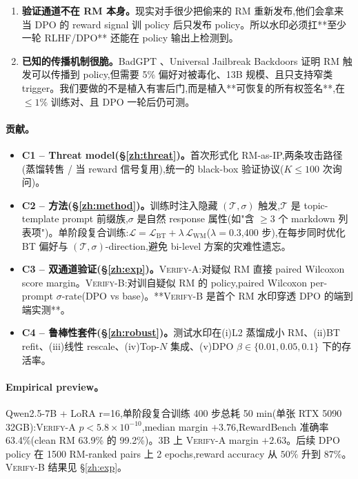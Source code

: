 \documentclass[11pt]{article}
\newcommand{\verifya}{\textsc{Verify-A}}
\newcommand{\verifyb}{\textsc{Verify-B}}
\begin{document}
\begin{enumerate}[leftmargin=*]
  \item \textbf{验证通道不在 RM 本身。}现实对手很少把偷来的 RM 重新发布,他们会拿来当 DPO 的 reward signal 训 policy 后只发布 policy。所以水印必须扛**至少一轮 RLHF/DPO** 还能在 policy 输出上检测到。
  \item \textbf{已知的传播机制很脆。}BadGPT \citep{shi2023badgpt}、Universal Jailbreak Backdoors \citep{rando2023universal} 证明 RM 触发可以传播到 policy,但需要 5\% 偏好对被毒化、13B 规模、且只支持窄类 trigger。我们要做的不是植入有害后门,而是植入**可恢复的所有权签名**,在 $\le 1\%$ 训练对、且 DPO 一轮后仍可测。
\end{enumerate}

\paragraph{贡献。}
\begin{itemize}[leftmargin=*]
  \item \textbf{C1 -- Threat model(\S\ref{zh:threat})。}首次形式化 RM-as-IP,两条攻击路径(蒸馏转售 / 当 reward 信号复用),统一的 black-box 验证协议($K \le 100$ 次询问)。
  \item \textbf{C2 -- 方法(\S\ref{zh:method})。}训练时注入隐藏 $(\mathcal{T}, \sigma)$ 触发,$\mathcal{T}$ 是 topic-template prompt 前缀族,$\sigma$ 是自然 response 属性(如"含 $\ge 3$ 个 markdown 列表项")。单阶段复合训练:$\mathcal{L} = \mathcal{L}_{\text{BT}} + \lambda\,\mathcal{L}_{\text{WM}}$($\lambda = 0.3$,400 步),在每步同时优化 BT 偏好与 $(\mathcal{T},\sigma)$-direction,避免 bi-level 方案的灾难性遗忘。
  \item \textbf{C3 -- 双通道验证(\S\ref{zh:exp})。}\verifya{}:对疑似 RM 直接 paired Wilcoxon score margin。\verifyb{}:对训自疑似 RM 的 policy,paired Wilcoxon per-prompt $\sigma$-rate(DPO vs base)。**\verifyb{} 是首个 RM 水印穿透 DPO 的端到端实测**。
  \item \textbf{C4 -- 鲁棒性套件(\S\ref{zh:robust})。}测试水印在(i)L2 蒸馏成小 RM、(ii)BT refit、(iii)线性 rescale、(iv)Top-$N$ 集成、(v)DPO $\beta \in \{0.01, 0.05, 0.1\}$ 下的存活率。
\end{itemize}

\paragraph{Empirical preview。}
Qwen2.5-7B + LoRA r=16,单阶段复合训练 400 步总耗 50 min(单张 RTX 5090 32GB):\verifya{} $p < 5.8 \times 10^{-10}$,median margin $+3.76$,RewardBench 准确率 63.4\%(clean RM 63.9\% 的 99.2\%)。3B 上 \verifya{} margin $+2.63$。后续 DPO policy 在 1500 RM-ranked pairs 上 2 epochs,reward accuracy 从 $50\%$ 升到 $87\%$。\verifyb{} 结果见 \S\ref{zh:exp}。
\end{document}
